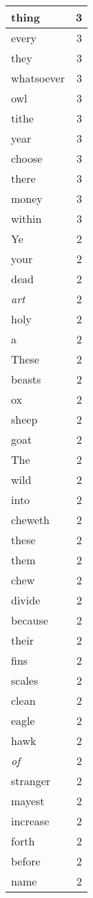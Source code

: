 \begin{center}
\begin{longtable}{l|r}
thing & 3 \\ \hline
every & 3 \\ \hline
they & 3 \\ \hline
whatsoever & 3 \\ \hline
owl & 3 \\ \hline
tithe & 3 \\ \hline
year & 3 \\ \hline
choose & 3 \\ \hline
there & 3 \\ \hline
money & 3 \\ \hline
within & 3 \\ \hline
Ye & 2 \\ \hline
your & 2 \\ \hline
dead & 2 \\ \hline
\emph{art} & 2 \\ \hline
holy & 2 \\ \hline
a & 2 \\ \hline
These & 2 \\ \hline
beasts & 2 \\ \hline
ox & 2 \\ \hline
sheep & 2 \\ \hline
goat & 2 \\ \hline
The & 2 \\ \hline
wild & 2 \\ \hline
into & 2 \\ \hline
cheweth & 2 \\ \hline
these & 2 \\ \hline
them & 2 \\ \hline
chew & 2 \\ \hline
divide & 2 \\ \hline
because & 2 \\ \hline
their & 2 \\ \hline
fins & 2 \\ \hline
scales & 2 \\ \hline
clean & 2 \\ \hline
eagle & 2 \\ \hline
hawk & 2 \\ \hline
\emph{of} & 2 \\ \hline
stranger & 2 \\ \hline
mayest & 2 \\ \hline
increase & 2 \\ \hline
forth & 2 \\ \hline
before & 2 \\ \hline
name & 2 \\ \hline

\end{longtable}
\end{center}
